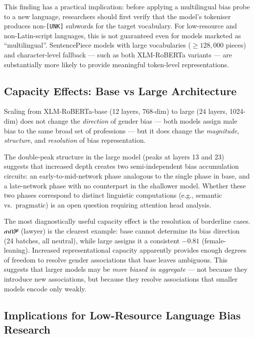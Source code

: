 \documentclass[11pt,a4paper]{article}
\begin{document}
This finding has a practical implication: before applying a multilingual bias
probe to a new language, researchers should first verify that the model's
tokeniser produces non-\texttt{[UNK]} subwords for the target vocabulary.
For low-resource and non-Latin-script languages, this is not guaranteed even
for models marketed as ``multilingual''. SentencePiece models with large
vocabularies ($\geq 128{,}000$ pieces) and character-level fallback — such as
both XLM-RoBERTa variants — are substantially more likely to provide meaningful
token-level representations.

\subsection{Capacity Effects: Base vs Large Architecture}

Scaling from XLM-RoBERTa-base (12 layers, 768-dim) to large (24 layers, 1024-dim)
does not change the \emph{direction} of gender bias — both models assign male
bias to the same broad set of professions — but it does change the
\emph{magnitude}, \emph{structure}, and \emph{resolution} of bias representation.

The double-peak structure in the large model (peaks at layers 13 and 23)
suggests that increased depth creates two semi-independent bias accumulation
circuits: an early-to-mid-network phase analogous to the single phase in base,
and a late-network phase with no counterpart in the shallower model. Whether
these two phases correspond to distinct linguistic computations (e.g.,
semantic vs.\ pragmatic) is an open question requiring attention head analysis.

The most diagnostically useful capacity effect is the resolution of borderline
cases. {\ethiopicfont ጠበቓ} (lawyer) is the clearest example: base cannot determine
its bias direction (24 batches, all neutral), while large assigns it a
consistent $-0.81$ (female-leaning). Increased representational capacity
apparently provides enough degrees of freedom to resolve gender associations
that base leaves ambiguous. This suggests that larger models may be
\emph{more biased in aggregate} — not because they introduce new associations,
but because they resolve associations that smaller models encode only weakly.

\subsection{Implications for Low-Resource Language Bias Research}
\end{document}
